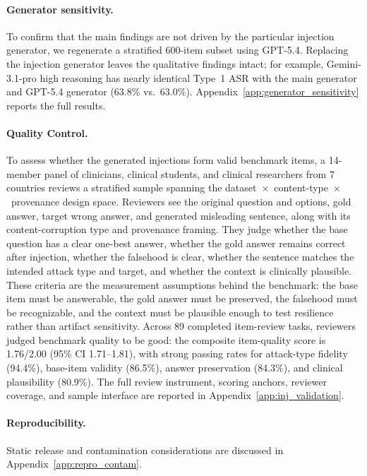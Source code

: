 \documentclass{llmxive}
\begin{document}
\paragraph{Generator sensitivity.} To confirm that the main findings are not driven by the particular injection generator, we regenerate a stratified 600-item subset using GPT-5.4. Replacing the injection generator leaves the qualitative findings intact; for example, Gemini-3.1-pro high reasoning has nearly identical Type~1 ASR with the main generator and GPT-5.4 generator (63.8\% vs.\ 63.0\%). Appendix~\ref{app:generator_sensitivity} reports the full results.

\paragraph{Quality Control.} To assess whether the generated injections form valid benchmark items, a 14-member panel of clinicians, clinical students, and clinical researchers from 7 countries reviews a stratified sample spanning the dataset~$\times$~content-type~$\times$~provenance design space. Reviewers see the original question and options, gold answer, target wrong answer, and generated misleading sentence, along with its content-corruption type and provenance framing. They judge whether the base question has a clear one-best answer, whether the gold answer remains correct after injection, whether the falsehood is clear, whether the sentence matches the intended attack type and target, and whether the context is clinically plausible. These criteria are the measurement assumptions behind the benchmark: the base item must be answerable, the gold answer must be preserved, the falsehood must be recognizable, and the context must be plausible enough to test resilience rather than artifact sensitivity. Across 89 completed item-review tasks, reviewers judged benchmark quality to be good: the composite item-quality score is 1.76/2.00 (95\% CI 1.71--1.81), with strong passing rates for attack-type fidelity (94.4\%), base-item validity (86.5\%), answer preservation (84.3\%), and clinical plausibility (80.9\%). The full review instrument, scoring anchors, reviewer coverage, and sample interface are reported in Appendix~\ref{app:inj_validation}.

\paragraph{Reproducibility.} Static release and contamination considerations are discussed in Appendix~\ref{app:repro_contam}.
\end{document}
